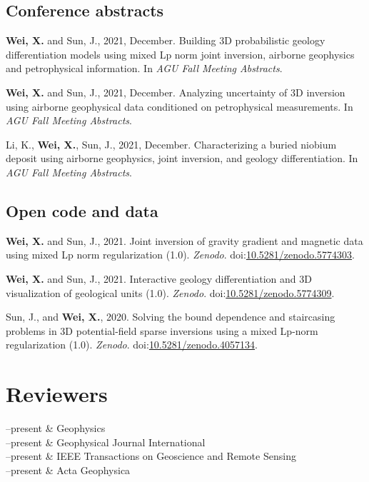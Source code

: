 \documentclass[11pt, a4paper]{article}
\newcommand{\LastName}{Wei}
\newcommand{\Initials}{X}
\newcommand{\Wei}{\textbf{\LastName, \Initials.}}  %
\newcommand{\WeiSun}{\textbf{\LastName, \Initials.} and Sun, J.}  %
\newcommand{\Duration}[2]{\fontsize{10pt}{0}\selectfont #1--#2}
\newcommand{\DOI}[1]{doi:\href{https://doi.org/#1}{#1}}
\begin{document}
\subsection*{Conference abstracts}
\begin{etaremune}
	
	\item 
	\WeiSun, 2021, December. Building 3D probabilistic geology differentiation models using mixed Lp norm joint inversion, airborne geophysics and petrophysical information. In \emph{AGU Fall Meeting Abstracts}.
	
	\item 
	\WeiSun, 2021, December. Analyzing uncertainty of 3D inversion using airborne geophysical data conditioned on petrophysical measurements. In \emph{AGU Fall Meeting Abstracts}.
	
	\item 
	Li, K., \Wei, Sun, J., 2021, December. Characterizing a buried niobium deposit using airborne geophysics, joint inversion, and geology differentiation. In \emph{AGU Fall Meeting Abstracts}.	
	
\end{etaremune}


\subsection*{Open code and data}
\begin{etaremune}
	
	\item 
	\WeiSun, 2021. Joint inversion of gravity gradient and magnetic data using mixed Lp norm regularization (1.0). \emph{Zenodo}. \DOI{10.5281/zenodo.5774303}.
	
	\item 
	\WeiSun, 2021. Interactive geology differentiation and 3D visualization of geological units (1.0). \emph{Zenodo}. \DOI{10.5281/zenodo.5774309}.
	
	\item 
	Sun, J., and \Wei, 2020. Solving the bound dependence and staircasing problems in 3D potential-field sparse inversions using a mixed Lp-norm regularization (1.0). \emph{Zenodo}. \DOI{10.5281/zenodo.4057134}.
	
\end{etaremune}


\section*{Reviewers}
\begin{EntriesTable}
	
	\Duration{2021}{present}  &
	Geophysics
	\\
	\Duration{2021}{present}  &
	Geophysical Journal International
	\\
	\Duration{2021}{present}  &
	IEEE Transactions on Geoscience and Remote Sensing
	\\	
	\Duration{2021}{present}  &
	Acta Geophysica

\end{EntriesTable}
\end{document}
